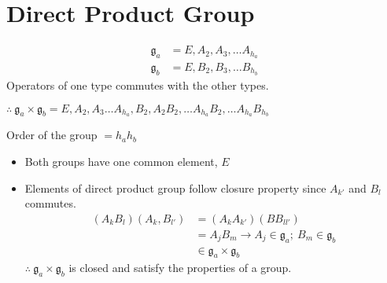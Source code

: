 \section*{Direct Product Group}
\begin{align*}
\mathfrak{g}_{a} &= E,A_{2},A_{3},\ldots A_{h_{a}}\\
\mathfrak{g}_{b} &= E, B_{2},B_{3},\ldots B_{h_{b}}
\end{align*}
Operators of one type commutes with the other types.

$\therefore \ \mathfrak{g}_{a}\times \mathfrak{g}_{b}=E,A_{2},A_{3}\ldots A_{h_{a}},B_{2},A_{2}B_{2},\ldots A_{h_{a}}B_{2},\ldots A_{h_{a}}B_{h_{b}}$

Order of the group $=h_{a}h_{b}$
\begin{itemize}
\item Both groups have one common element, $E$

\item Elements of direct product group follow closure property since $A_{k'}$ and $B_{l}$ commutes.
\begin{align*}
(A_{k}B_{l})(A_{k},B_{l'}) &= (A_{k}A_{k'})(BB_{ll'})\\
&= A_{j}B_{m}\to A_{j}\in \mathfrak{g}_{a}; \ B_{m}\in \mathfrak{g}_{b}\\
&\in \mathfrak{g}_{a}\times \mathfrak{g}_{b}
\end{align*}
$\therefore \ \mathfrak{g}_{a}\times \mathfrak{g}_{b}$ is closed and satisfy the properties of a group.
\end{itemize}

